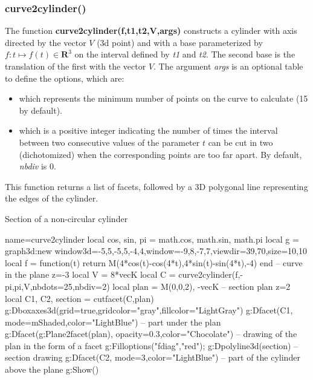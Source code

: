 \subsubsection{curve2cylinder()}
The function \textbf{curve2cylinder(f,t1,t2,V,args)} constructs a cylinder with axis directed by the vector $V$ (3d point) and with a base parameterized by $f\colon t\mapsto f(t)\in\mathbf R^3$ on the interval defined by \emph{t1} and \emph{t2}. The second base is the translation of the first with the vector $V$. The argument \emph{args} is an optional table to define the options, which are:
\begin{itemize}
    \item {} which represents the minimum number of points on the curve to calculate (15 by default).     \item {} which is a positive integer indicating the number of times the interval between two consecutive values ​​of the parameter $t$ can be cut in two (dichotomized) when the corresponding points are too far apart. By default, \emph{nbdiv} is 0.
\end{itemize}
This function returns a list of facets, followed by a 3D polygonal line representing the edges of the cylinder.

\begin{demo}{Section of a non-circular cylinder}
\begin{luadraw}{name=curve2cylinder}
local cos, sin, pi = math.cos, math.sin, math.pi
local g = graph3d:new{ window3d={-5,5,-5,5,-4,4},window={-9,8,-7,7},viewdir={39,70},size={10,10}}
local f = function(t) return M(4*cos(t)-cos(4*t),4*sin(t)-sin(4*t),-4) end -- curve in the plane z=-3
local V = 8*vecK
local C = curve2cylinder(f,-pi,pi,V,{nbdots=25,nbdiv=2})
local plan = {M(0,0,2), -vecK} -- section plan z=2
local C1, C2, section = cutfacet(C,plan)
g:Dboxaxes3d({grid=true,gridcolor="gray",fillcolor="LightGray"})
g:Dfacet(C1, {mode=mShaded,color="LightBlue"})  -- part under the plan
g:Dfacet(g:Plane2facet(plan), {opacity=0.3,color="Chocolate"}) -- drawing of the plan in the form of a facet
g:Filloptions("fdiag","red"); g:Dpolyline3d(section) -- section drawing
g:Dfacet(C2, {mode=3,color="LightBlue"})  -- part of the cylinder above the plane
g:Show()
\end{luadraw}
\end{demo}

